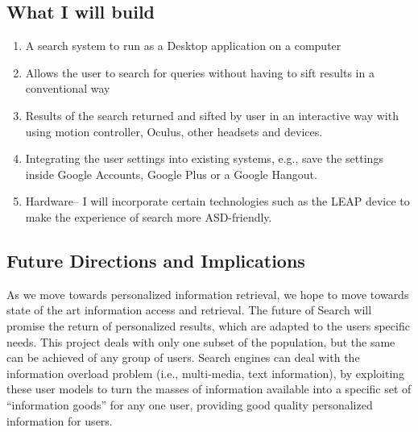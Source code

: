 \documentclass[10pt]{article}
\begin{document}
\subsection{What I will build}
\begin{enumerate}
\item A search system to run as a Desktop application on a computer 
\item Allows the user to search for queries without having to sift results in a conventional way
\item Results of the search returned and sifted by user in an interactive way with using motion controller, Oculus, other headsets and devices.
\item Integrating the user settings into existing systems, e.g., save the settings inside Google Accounts, Google Plus or a Google Hangout.
\item Hardware– I will incorporate certain technologies such as the LEAP device to make the experience of search more ASD-friendly.

\end{enumerate}
\subsection{Future Directions and Implications}
As we move towards personalized information retrieval, we hope to move towards state of the art information access and retrieval. The future of Search will promise the return of personalized results, which are adapted to the users specific needs. This project deals with only one subset of the population, but the same can be achieved of any group of users. Search engines can deal with the information overload problem (i.e., multi-media, text information), by exploiting these user models to turn the masses of information available into a specific set of “information goods” for any one user, providing good quality personalized information for users.
\end{document}
